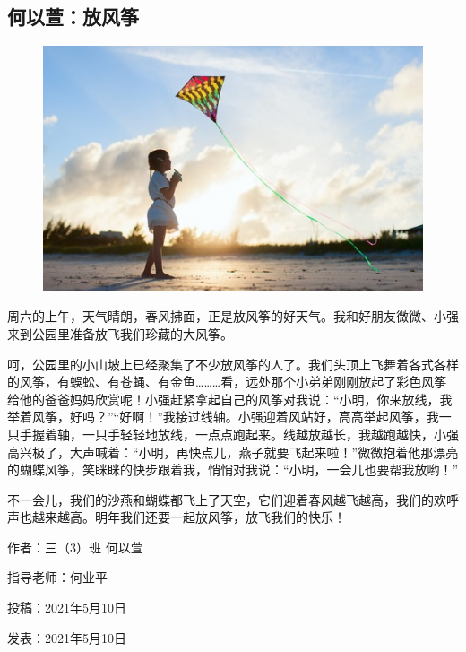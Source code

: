 \vspace{10pt}

{\centering\subsection*{何以萱：放风筝}}


\renewcommand{\leftmark}{何以萱：放风筝}

\begin{figure}[htbp]

\centering

\includegraphics[width = .5\textwidth]{./ch/27.jpg}

\end{figure}



周六的上午，天气晴朗，春风拂面，正是放风筝的好天气。我和好朋友微微、小强来到公园里准备放飞我们珍藏的大风筝。

呵，公园里的小山坡上已经聚集了不少放风筝的人了。我们头顶上飞舞着各式各样的风筝，有蜈蚣、有苍蝇、有金鱼………看，远处那个小弟弟刚刚放起了彩色风筝给他的爸爸妈妈欣赏呢！小强赶紧拿起自己的风筝对我说：“小明，你来放线，我举着风筝，好吗？”“好啊！”我接过线轴。小强迎着风站好，高高举起风筝，我一只手握着轴，一只手轻轻地放线，一点点跑起来。线越放越长，我越跑越快，小强高兴极了，大声喊着：“小明，再快点儿，燕子就要飞起来啦！”微微抱着他那漂亮的蝴蝶风筝，笑眯眯的快步跟着我，悄悄对我说：“小明，一会儿也要帮我放哟！”

不一会儿，我们的沙燕和蝴蝶都飞上了天空，它们迎着春风越飞越高，我们的欢呼声也越来越高。明年我们还要一起放风筝，放飞我们的快乐！





\vspace{10pt}



作者：三（3）班 何以萱



指导老师：何业平



投稿：2021年5月10日



发表：2021年5月10日




                



\vspace{10pt}

\hline



